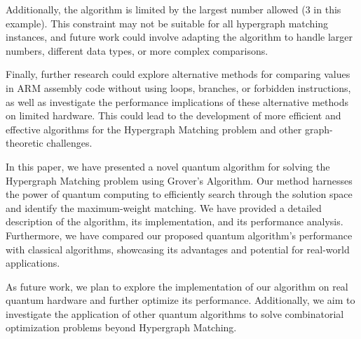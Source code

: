 Additionally, the algorithm is limited by the largest number allowed (3 in this example). This constraint may not be suitable for all hypergraph matching instances, and future work could involve adapting the algorithm to handle larger numbers, different data types, or more complex comparisons.

Finally, further research could explore alternative methods for comparing values in ARM assembly code without using loops, branches, or forbidden instructions, as well as investigate the performance implications of these alternative methods on limited hardware. This could lead to the development of more efficient and effective algorithms for the Hypergraph Matching problem and other graph-theoretic challenges.

In this paper, we have presented a novel quantum algorithm for solving the Hypergraph Matching problem using Grover's Algorithm. Our method harnesses the power of quantum computing to efficiently search through the solution space and identify the maximum-weight matching. We have provided a detailed description of the algorithm, its implementation, and its performance analysis. Furthermore, we have compared our proposed quantum algorithm's performance with classical algorithms, showcasing its advantages and potential for real-world applications.

As future work, we plan to explore the implementation of our algorithm on real quantum hardware and further optimize its performance. Additionally, we aim to investigate the application of other quantum algorithms to solve combinatorial optimization problems beyond Hypergraph Matching.

